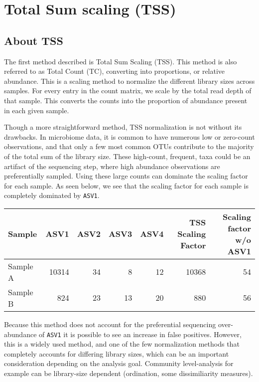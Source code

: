 \documentclass[
]{book}
\begin{document}
\hypertarget{total-sum-scaling-tss}{%
\chapter{Total Sum scaling (TSS)}\label{total-sum-scaling-tss}}

\hypertarget{about-tss}{%
\section{About TSS}\label{about-tss}}

The first method described is Total Sum Scaling (TSS). This method is also referred to as Total Count (TC), converting into proportions, or relative abundance. This is a scaling method to normalize the different library sizes across samples. For every entry in the count matrix, we scale by the total read depth of that sample. This converts the counts into the proportion of abundance present in each given sample.

Though a more straightforward method, TSS normalization is not without its drawbacks. In microbiome data, it is common to have numerous low or zero-count observations, and that only a few most common OTUs contribute to the majority of the total sum of the library size. These high-count, frequent, taxa could be an artifact of the sequencing step, where high abundance observations are preferentially sampled. Using these large counts can dominate the scaling factor for each sample. As seen below, we see that the scaling factor for each sample is completely dominated by \texttt{ASV1}.

\begin{tabular}{l|r|r|r|r|r|r}
\hline
Sample & ASV1 & ASV2 & ASV3 & ASV4 & TSS Scaling Factor & Scaling factor w/o ASV1\\
\hline
Sample A & 10314 & 34 & 8 & 12 & 10368 & 54\\
\hline
Sample B & 824 & 23 & 13 & 20 & 880 & 56\\
\hline
\end{tabular}

Because this method does not account for the preferential sequencing over-abundance of \texttt{ASV1} it is possible to see an increase in false positives. However, this is a widely used method, and one of the few normalization methods that completely accounts for differing library sizes, which can be an important consideration depending on the analysis goal. Community level-analysis for example can be library-size dependent (ordination, some dissimiliarity measures).
\end{document}
